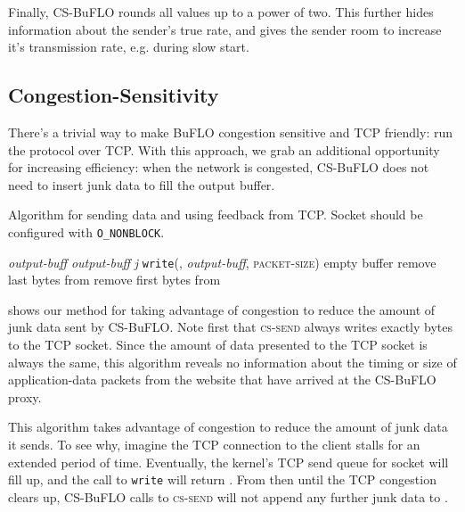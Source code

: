 \documentclass[10pt,journal]{IEEEtran}
\newcommand{\packetsize}{{\sc\textsc{packet-size}}\xspace}
\newcommand{\buflo} {BuFLO\xspace}
\newcommand{\csb} {CS-BuFLO\xspace}
\begin{document}
Finally, \csb rounds all  values up to a power of two.
This further hides information about the sender's true rate, and gives
the sender room to increase it's transmission rate, e.g. during slow
start.

\subsection{Congestion-Sensitivity}
\label{ssec:congestion-sensitivity}

There's a trivial way to make \buflo congestion sensitive and TCP
friendly: run the protocol over TCP. With this approach, we grab an 
additional opportunity for increasing efficiency: when the network is
congested, \csb does not need to insert junk data to fill the output
buffer.


\begin{algorithm}[t]
  \caption{Algorithm for sending data and using feedback from TCP.
    Socket  should be configured with \texttt{O\_NONBLOCK}.}
  \label{alg:cssend}
  \begin{algorithmic}
      \State {}
      \State 
      \If{}
        \State 
        \State  \emph{output-buff}   \emph{output-buff}  \emph{j}
      \EndIf
      \State   \texttt{write}(, \emph{output-buff}, \packetsize)
      \If{} 
        \State  empty buffer
        \State 
      \Else
        \State remove last  bytes from 
        \State remove first  bytes from 
        \State 
      \EndIf
      \State \Return 
    \EndFunction
  \end{algorithmic}
\end{algorithm}


 shows our method for taking advantage of congestion
to reduce the amount of junk data sent by \csb.  Note first that
\textsc{cs-send} always writes exactly  bytes to the TCP socket.
Since the amount of data presented to the TCP socket is always the
same, this algorithm reveals no information about the timing or size
of application-data packets from the website that have arrived at the
\csb proxy.

This algorithm takes advantage of congestion to reduce the amount of
junk data it sends.  To see why, imagine the TCP connection to the
client stalls for an extended period of time.  Eventually, the
kernel's TCP send queue for socket  will fill up, and the call to
\texttt{write} will return .  From then until the TCP congestion
clears up, \csb calls to \textsc{cs-send} will not append any further
junk data to .  
\end{document}
